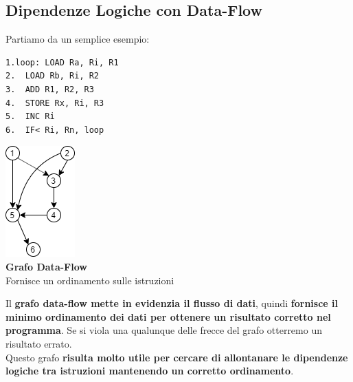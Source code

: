 \documentclass[10pt]{report}
\begin{document}
\subsection{Dipendenze Logiche con Data-Flow}
Partiamo da un semplice esempio:
\begin{multicols}{2}
\begin{lstlisting}
1.loop:	LOAD Ra, Ri, R1
2.	LOAD Rb, Ri, R2
3.	ADD R1, R2, R3
4.	STORE Rx, Ri, R3
5.	INC Ri
6.	IF< Ri, Rn, loop
\end{lstlisting}
\columnbreak
\begin{center}
\includegraphics[scale=1]{dataflow_1.png}\\
\textbf{Grafo Data-Flow}\\
Fornisce un ordinamento sulle istruzioni
\end{center}
\end{multicols}
Il \textbf{grafo data-flow mette in evidenzia il flusso di dati}, quindi \textbf{fornisce il minimo ordinamento dei dati per ottenere un risultato corretto nel programma}. Se si viola una qualunque delle frecce del grafo otterremo un risultato errato.\\
Questo grafo \textbf{risulta molto utile per cercare di allontanare le dipendenze logiche tra istruzioni mantenendo un corretto ordinamento}.
\pagebreak
\end{document}
